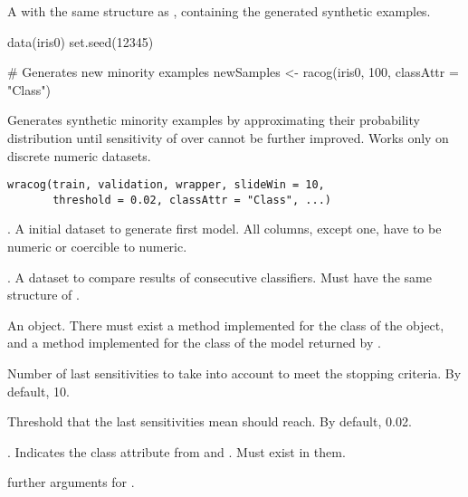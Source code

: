 %
\begin{Value}
A  with the same structure as ,
containing the generated synthetic examples.
\end{Value}
%
%
\begin{Examples}
\begin{ExampleCode}
data(iris0)
set.seed(12345)

# Generates new minority examples
newSamples <- racog(iris0, 100, classAttr = "Class")

\end{ExampleCode}
\end{Examples}
%
\begin{Description}\relax
Generates synthetic minority examples by approximating their probability
distribution until sensitivity of  over 
cannot be further improved. Works only on discrete numeric datasets.
\end{Description}
%
\begin{Usage}
\begin{verbatim}
wracog(train, validation, wrapper, slideWin = 10, 
       threshold = 0.02, classAttr = "Class", ...)
\end{verbatim}
\end{Usage}
%
\begin{Arguments}
\begin{ldescription}
\item[\code{train}] . A initial dataset to generate first model.
All columns, except  one, have to be numeric or coercible
to numeric.

\item[\code{validation}] . A dataset to compare results of
consecutive classifiers. Must have the same structure of .

\item[\code{wrapper}] An  object. There must exist a method
 implemented for the class of the object, and a
 method implemented for the class of the model
returned by .

\item[\code{slideWin}] Number of last sensitivities to take into account to meet the
stopping criteria. By default, 10.

\item[\code{threshold}] Threshold that the last  sensitivities mean
should reach. By default, 0.02.

\item[\code{classAttr}] . Indicates the class attribute from
 and . Must exist in them.

\item[\code{...}] further arguments for .
\end{ldescription}
\end{Arguments}
